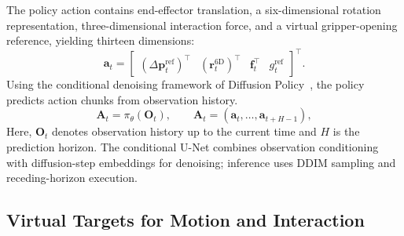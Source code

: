 The policy action contains end-effector translation, a six-dimensional rotation representation, three-dimensional interaction force, and a virtual gripper-opening reference, yielding thirteen dimensions:
\begin{equation}
    \mathbf{a}_t=
    \begin{bmatrix}
        (\Delta\mathbf{p}_t^{\mathrm{ref}})^\top &
        (\mathbf{r}_t^{6\mathrm{D}})^\top &
        \mathbf{f}_t^\top & g_t^{\mathrm{ref}}
    \end{bmatrix}^{\top}.
    \label{eq:policy_action}
\end{equation}
Using the conditional denoising framework of Diffusion Policy~\cite{diffusion_policy}, the policy predicts action chunks from observation history.
\begin{equation}
    \mathbf{A}_t=\pi_{\theta}(\mathbf{O}_t),
    \qquad
    \mathbf{A}_t=(\mathbf{a}_t,\ldots,\mathbf{a}_{t+H-1}),
    \label{eq:action_chunk}
\end{equation}
Here, $\mathbf{O}_t$ denotes observation history up to the current time and $H$ is the prediction horizon.
The conditional U-Net combines observation conditioning with diffusion-step embeddings for denoising; inference uses DDIM sampling and receding-horizon execution.

\subsection{Virtual Targets for Motion and Interaction}

